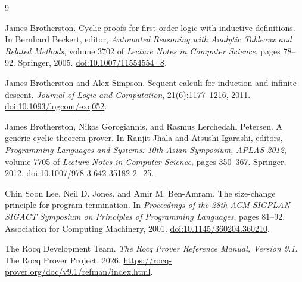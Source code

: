 \documentclass[11pt,oneside]{book}
\begin{document}
\begin{thebibliography}{9}

James Brotherston.
\newblock Cyclic proofs for first-order logic with inductive definitions.
\newblock In Bernhard Beckert, editor, \emph{Automated Reasoning with Analytic
Tableaux and Related Methods}, volume 3702 of \emph{Lecture Notes in Computer
Science}, pages 78--92. Springer, 2005.
\newblock \href{https://doi.org/10.1007/11554554_8}%
{doi:10.1007/11554554\_8}.

James Brotherston and Alex Simpson.
\newblock Sequent calculi for induction and infinite descent.
\newblock \emph{Journal of Logic and Computation}, 21(6):1177--1216, 2011.
\newblock \href{https://doi.org/10.1093/logcom/exq052}%
{doi:10.1093/logcom/exq052}.

James Brotherston, Nikos Gorogiannis, and Rasmus Lerchedahl Petersen.
\newblock A generic cyclic theorem prover.
\newblock In Ranjit Jhala and Atsushi Igarashi, editors, \emph{Programming
Languages and Systems: 10th Asian Symposium, APLAS 2012}, volume 7705 of
\emph{Lecture Notes in Computer Science}, pages 350--367. Springer, 2012.
\newblock \href{https://doi.org/10.1007/978-3-642-35182-2_25}%
{doi:10.1007/978-3-642-35182-2\_25}.

Chin Soon Lee, Neil D. Jones, and Amir M. Ben-Amram.
\newblock The size-change principle for program termination.
\newblock In \emph{Proceedings of the 28th ACM SIGPLAN-SIGACT Symposium on
Principles of Programming Languages}, pages 81--92. Association for Computing
Machinery, 2001.
\newblock \href{https://doi.org/10.1145/360204.360210}%
{doi:10.1145/360204.360210}.

The Rocq Development Team.
\newblock \emph{The Rocq Prover Reference Manual, Version 9.1}.
\newblock The Rocq Prover Project, 2026.
\newblock \url{https://rocq-prover.org/doc/v9.1/refman/index.html}.

\end{thebibliography}
\end{document}

